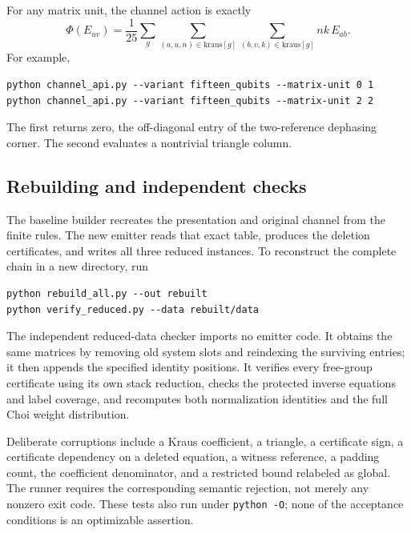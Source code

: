 For any matrix unit, the channel action is exactly
\begin{equation}
 \Phi(E_{uv})=\frac1{25}\sum_g
 \sum_{(a,u,n)\in\mathrm{kraus}[g]}
 \sum_{(b,v,k)\in\mathrm{kraus}[g]}nk\,E_{ab}.
\end{equation}
For example,
\begin{lstlisting}
python channel_api.py --variant fifteen_qubits --matrix-unit 0 1
python channel_api.py --variant fifteen_qubits --matrix-unit 2 2
\end{lstlisting}
The first returns zero, the off-diagonal entry of the two-reference dephasing corner.
The second evaluates a nontrivial triangle column.

\subsection{Rebuilding and independent checks}
The baseline builder recreates the presentation and original channel from the finite rules.
The new emitter reads that exact table, produces the deletion certificates, and writes all
three reduced instances. To reconstruct the complete chain in a new directory, run
\begin{lstlisting}
python rebuild_all.py --out rebuilt
python verify_reduced.py --data rebuilt/data
\end{lstlisting}
The independent reduced-data checker imports no emitter code. It obtains the same matrices
by removing old system slots and reindexing the surviving entries; it then appends the
specified identity positions. It verifies every free-group certificate using its own stack
reduction, checks the protected inverse equations and label coverage, and recomputes both
normalization identities and the full Choi weight distribution.

Deliberate corruptions include a Kraus coefficient, a triangle, a certificate sign, a
certificate dependency on a deleted equation, a witness reference, a padding count, the
coefficient denominator, and a restricted bound relabeled as global. The runner requires the
corresponding semantic rejection, not merely any nonzero exit code. These tests also run
under \texttt{python -O}; none of the acceptance conditions is an optimizable assertion.

